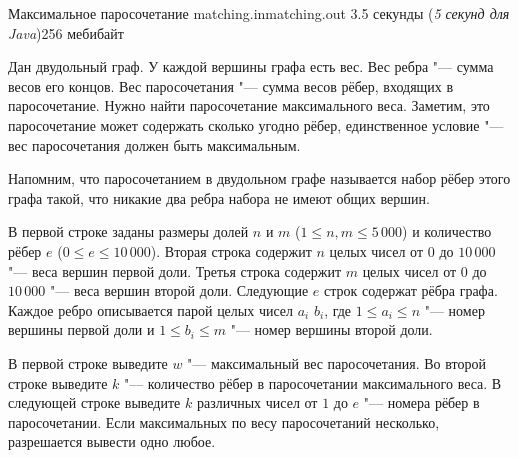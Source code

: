 
\gdef\thisproblemauthor{Сергей Копелиович}
\gdef\thisproblemdeveloper{Сергей Копелиович}
\begin{problem}{Максимальное паросочетание}
{matching.in}{matching.out}
{3.5 секунды (\textsl{5 секунд для Java})}{256 мебибайт}{}

Дан двудольный граф.
У каждой вершины графа есть вес.
Вес ребра "--- сумма весов его концов.
Вес паросочетания "--- сумма весов рёбер, входящих в паросочетание.
Нужно найти паросочетание максимального веса.
Заметим, это паросочетание может содержать сколько угодно рёбер,
единственное условие "--- вес паросочетания должен быть максимальным.

Напомним, что паросочетанием в двудольном графе называется набор
рёбер этого графа такой, что никакие два ребра набора не имеют общих вершин.

\InputFile

В первой строке заданы размеры долей $n$ и $m$ ($1 \le n, m \le 5\,000$) и
количество рёбер $e$ ($0 \le e \le 10\,000$).
Вторая строка содержит $n$ целых чисел от $0$ до $10\,000$ "--- веса вершин
первой доли.
Третья строка содержит $m$ целых чисел от $0$ до $10\,000$ "--- веса вершин
второй доли.
Следующие $e$ строк содержат рёбра графа.
Каждое ребро описывается парой целых чисел $a_i$ $b_i$,
где $1 \le a_i \le n$ "--- номер вершины первой доли
и $1 \le b_i \le m$ "--- номер вершины второй доли.

\OutputFile

В первой строке выведите $w$ "--- максимальный вес паросочетания.
Во второй строке выведите $k$ "--- количество рёбер в паросочетании
максимального веса.
В следующей строке выведите $k$ различных чисел от $1$ до $e$ "--- номера
рёбер в паросочетании.
Если максимальных по весу паросочетаний несколько, разрешается вывести
одно любое.

\Examples

\begin{example}
%
%
\end{example}

\end{problem}
